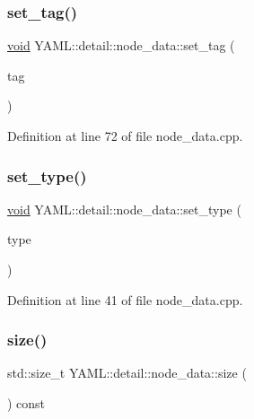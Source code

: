 \subsubsection{\texorpdfstring{set\_tag()}{set\_tag()}}
{\footnotesize\ttfamily \mbox{\hyperlink{glad_8h_a950fc91edb4504f62f1c577bf4727c29}{void}} Y\+A\+M\+L\+::detail\+::node\+\_\+data\+::set\+\_\+tag (\begin{DoxyParamCaption}\item[{const \mbox{\hyperlink{glad_8h_ac83513893df92266f79a515488701770}{std\+::string}} \&}]{tag }\end{DoxyParamCaption})}



Definition at line 72 of file node\+\_\+data.\+cpp.

\mbox{\label{class_y_a_m_l_1_1detail_1_1node__data_a5d95af82af117629f60af392cc6bcab2}} 
\subsubsection{\texorpdfstring{set\_type()}{set\_type()}}
{\footnotesize\ttfamily \mbox{\hyperlink{glad_8h_a950fc91edb4504f62f1c577bf4727c29}{void}} Y\+A\+M\+L\+::detail\+::node\+\_\+data\+::set\+\_\+type (\begin{DoxyParamCaption}\item[{\mbox{\hyperlink{struct_y_a_m_l_1_1_node_type_af83cf3f3c2eca0bf0eae1bbf981e86c4}{Node\+Type\+::value}}}]{type }\end{DoxyParamCaption})}



Definition at line 41 of file node\+\_\+data.\+cpp.

\mbox{\label{class_y_a_m_l_1_1detail_1_1node__data_a2b64f36a1d6584d9032583fd6b4299e0}} 
\subsubsection{\texorpdfstring{size()}{size()}}
{\footnotesize\ttfamily std\+::size\+\_\+t Y\+A\+M\+L\+::detail\+::node\+\_\+data\+::size (\begin{DoxyParamCaption}{ }\end{DoxyParamCaption}) const}



